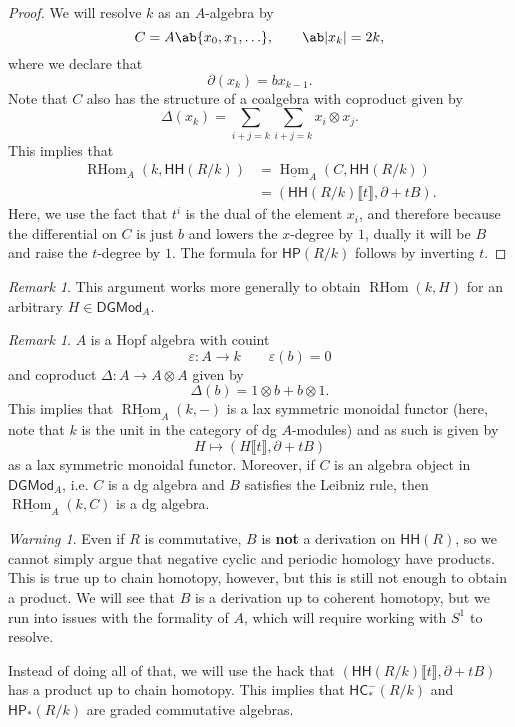 \documentclass[10pt, oneside]{memoir}
\theoremstyle{definition}
\theoremstyle{remark}
\newtheorem{rmk}[thm]{Remark}
\newtheorem{warn}[thm]{Warning}
\theoremstyle{plain}
\theoremstyle{definition}
\theoremstyle{remark}
\newcommand{\ep}{\varepsilon}
\newcommand{\ms}[1]{\mathsf{#1}}
\newcommand{\ul}[1]{\underline{#1}}
\newcommand{\1}{\mathbf{1}}
\newcommand{\2}{\mathbf{2}}
\newcommand{\3}{\mathbf{3}}
\newcommand{\ps}[1]{\llbracket #1 \rrbracket}
\newcommand{\HC}{\ms{HC}}
\newcommand{\HH}{\ms{HH}}
\newcommand{\HP}{\ms{HP}}
\DeclareMathOperator{\Hom}{Hom}
\DeclareMathOperator{\RHom}{RHom}
\begin{document}
\begin{proof}
    We will resolve $k$ as an $A$-algebra by
    \[ C = A\ab\{ x_0, x_1, \ldots\}, \qquad \ab|x_k| = 2k, \]
    where we declare that
    \[ \partial(x_k) = b x_{k-1}. \]
    Note that $C$ also has the structure of a coalgebra with coproduct given by
    \[ \Delta(x_k) = \sum_{i+j = k} \sum_{i+j=k} x_i \otimes x_j. \]
    This implies that
    \begin{align*}
        \RHom_A(k, \HH(R/k)) &= \ul{\Hom}_A(C, \HH(R/k)) \\
        &= (\HH(R/k)\ps{t}, \partial + tB).
    \end{align*}
    Here, we use the fact that $t^i$ is the dual of the element $x_i$, and therefore because the differential on $C$ is just $b$ and lowers the $x$-degree by $1$, dually it will be $B$ and raise the $t$-degree by $1$. The formula for $\HP(R/k)$ follows by inverting $t$.
\end{proof}

\begin{rmk}
    This argument works more generally to obtain $\RHom(k, H)$ for an arbitrary $H \in \ms{DGMod}_A$.
\end{rmk}

\begin{rmk}
    $A$ is a Hopf algebra with couint
    \[ \ep \colon A \to k \qquad \ep(b) = 0 \]
    and coproduct $\Delta \colon A \to A \otimes A$ given by
    \[ \Delta(b) = 1 \otimes b + b \otimes 1. \]
    This implies that $\ul{\RHom}_A(k, -)$ is a lax symmetric monoidal functor (here, note that $k$ is the unit in the category of dg $A$-modules) and as such is given by
    \[ H \mapsto (H \ps{t}, \partial + tB) \]
    as a lax symmetric monoidal functor. Moreover, if $C$ is an algebra object in $\ms{DGMod}_A$, i.e. $C$ is a dg algebra and $B$ satisfies the Leibniz rule, then $\ul{\RHom}_A(k, C)$ is a dg algebra.
\end{rmk}

\begin{warn}
    Even if $R$ is commutative, $B$ is \textbf{not} a derivation on $\HH(R)$, so we cannot simply argue that negative cyclic and periodic homology have products. This is true up to chain homotopy, however, but this is still not enough to obtain a product. We will see that $B$ is a derivation up to coherent homotopy, but we run into issues with the formality of $A$, which will require working with $S^1$ to resolve.

    Instead of doing all of that, we will use the hack that $(\HH(R/k)\ps{t}, \partial + tB)$ has a product up to chain homotopy. This implies that $\HC_*^-(R/k)$ and $\HP_*(R/k)$ are graded commutative algebras.
\end{warn}
\end{document}
